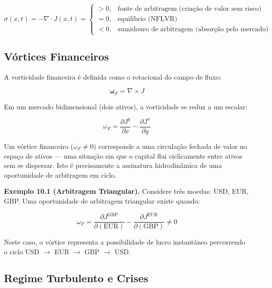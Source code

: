 \begin{equation}\label{eq:fonte-sumidouro}
\sigma(x,t) = -\nabla \cdot J(x,t) = 
\begin{cases}
> 0, & \text{fonte de arbitragem (cria\c{c}\~ao de valor sem risco)} \\
= 0, & \text{equil\'ibrio (NFLVR)} \\
< 0, & \text{sumidouro de arbitragem (absor\c{c}\~ao pelo mercado)}
\end{cases}
\end{equation}

\subsection{V\'ortices Financeiros}

A vorticidade financeira \'e definida como o rotacional do campo de fluxo:

\begin{equation}\label{eq:vorticidade-financeira}
\bm{\omega}_F = \nabla \times J
\end{equation}

Em um mercado bidimensional (dois ativos), a vorticidade se reduz a um escalar:

\begin{equation}\label{eq:vorticidade-2d}
\omega_F = \frac{\partial J^y}{\partial x} - \frac{\partial J^x}{\partial y}
\end{equation}

Um v\'ortice financeiro ($\omega_F \neq 0$) corresponde a uma circula\c{c}\~ao fechada de valor no espa\c{c}o de ativos --- uma situa\c{c}\~ao em que o capital flui ciclicamente entre ativos sem se dispersar. Isto \'e precisamente a assinatura hidrodin\^amica de uma oportunidade de arbitragem em ciclo.

\smallskip
\noindent\textbf{Exemplo 10.1 (Arbitragem Triangular).} Considere tr\^es moedas: USD, EUR, GBP. Uma oportunidade de arbitragem triangular existe quando:

\begin{equation}\label{eq:arbitragem-triangular}
\omega_F = \frac{\partial J^{\text{GBP}}}{\partial (\text{EUR})} - \frac{\partial J^{\text{EUR}}}{\partial (\text{GBP})} \neq 0
\end{equation}

Neste caso, o v\'ortice representa a possibilidade de lucro instant\^aneo percorrendo o ciclo USD $\to$ EUR $\to$ GBP $\to$ USD.

\subsection{Regime Turbulento e Crises}

